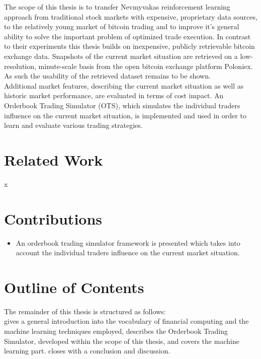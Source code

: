The scope of this thesis is to transfer Nevmyvakas \cite{Nevmyvaka:2006} reinforcement learning approach from traditional stock markets with expensive, proprietary data sources, to the relatively young market of bitcoin trading and to improve it's general ability to solve the important problem of optimized trade execution. In contrast to their experiments this thesis builds on inexpensive, publicly retrievable bitcoin exchange data. Snapshots of the current market situation are retrieved on a low-resolution, minute-scale basis from the open bitcoin exchange platform Poloniex. As such the usability of the retrieved dataset remains to be shown. \\

Additional market features, describing the current market situation as well as historic market performance, are evaluated in terms of cost impact. An Orderbook Trading Simulator (OTS), which simulates the individual traders influence on the current market situation, is implemented and used in order to learn and evaluate various trading strategies.


\section{Related Work}
\label{sec:relatedwork}
x

\section{Contributions}
\label{sec:contributions}
\begin{itemize}
\item An orderbook trading simulator framework is presented which takes into account the individual traders influence on the current market situation.

\end{itemize}

\section{Outline of Contents}
\label{sec:outline}
The remainder of this thesis is structured as follows:\\
 gives a general introduction into the vocabulary of financial computing and the machine learning techniques employed,  describes the Orderbook Trading  Simulator, developed within the scope of this thesis, and  covers the machine learning part.  closes with a conclusion and discussion.


\cleardoublepage{}